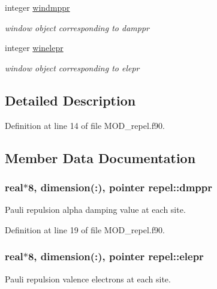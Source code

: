 \begin{DoxyCompactItemize}
integer \hyperlink{classrepel_a33de080471c0d2957bc43332a32b055f}{windmppr}
\begin{DoxyCompactList}\small\item\em window object corresponding to damppr \end{DoxyCompactList}\item 
integer \hyperlink{classrepel_abb02f8b2b5392a67b88a9651cbe602ad}{winelepr}
\begin{DoxyCompactList}\small\item\em window object corresponding to elepr \end{DoxyCompactList}\end{DoxyCompactItemize}


\subsection{Detailed Description}


Definition at line 14 of file M\-O\-D\-\_\-repel.\-f90.



\subsection{Member Data Documentation}
\hypertarget{classrepel_a6e8d98a05daee2d70e0fe648504b23e4}{
\subsubsection[{dmppr}]{\setlength{\rightskip}{0pt plus 5cm}real$\ast$8, dimension(\-:), pointer repel\-::dmppr}}\label{classrepel_a6e8d98a05daee2d70e0fe648504b23e4}


Pauli repulsion alpha damping value at each site. 



Definition at line 19 of file M\-O\-D\-\_\-repel.\-f90.

\hypertarget{classrepel_a42bde0e9432191e215fb58159ea9bee6}{
\subsubsection[{elepr}]{\setlength{\rightskip}{0pt plus 5cm}real$\ast$8, dimension(\-:), pointer repel\-::elepr}}\label{classrepel_a42bde0e9432191e215fb58159ea9bee6}


Pauli repulsion valence electrons at each site. 



